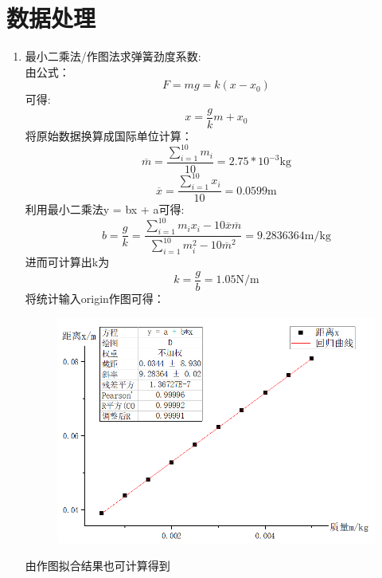 \documentclass[12pt]{ustcreport}
\begin{document}
\section{数据处理}
\begin{enumerate}
    \item 最小二乘法/作图法求弹簧劲度系数:\\
    由公式：
    \begin{equation*}
        F = mg = k(x-x_0)
    \end{equation*}
    可得:
    \begin{equation*}
        x = \frac{g}{k}m + x_0
    \end{equation*}
    将原始数据换算成国际单位计算：
    \begin{equation*}
        \overline{m} = \frac{\sum_{i = 1}^10 m_i}{10} = 2.75*10^{-3}\mathrm{kg}
    \end{equation*}
    \begin{equation*}
        \overline{x} = \frac{\sum_{i = 1}^10 x_i}{10} = 0.0599\mathrm{m}
    \end{equation*}
    利用最小二乘法y = bx + a可得:
    \begin{equation*}
        b = \frac{g}{k} = \frac{\sum_{i=1}^{10}m_ix_i-10\overline{x}\overline{m}}{\sum_{i=1}^{10}m_i^2-10\overline{m}^2} = 9.2836364 \mathrm{m}/\mathrm{kg}
    \end{equation*}
    进而可计算出k为
    \begin{equation*}
        k = \frac{g}{b} = 1.05 \mathrm{N}/\mathrm{m} 
    \end{equation*}
    将统计输入origin作图可得：
    \begin{figure}[H]
        \centering
        \includegraphics[width = 0.7\linewidth]{QQ图片20220401084307.png}
    \end{figure}
    由作图拟合结果也可计算得到
    \begin{equation*}

\end{equation*}
\end{enumerate}
\end{document}
